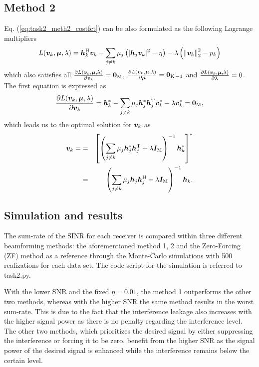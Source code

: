 \documentclass[10pt,a4paper]{article}
\begin{document}
\subsection*{Method 2}
Eq. (\ref{eq:task2_meth2_costfct}) can be also formulated as the following Lagrange multipliers
\begin{equation}
L ( \bm{v}_{k}, \bm{\mu}, \lambda ) =  \bm{h}_{k}^{\operatorname{H}} \bm{v}_k  - \sum_{j \neq k} \mu_{j} \left( \vert \bm{h}_{j} \bm{v}_{k} \vert^{2} - \eta \right) - \lambda \left( \left\lVert\bm{v}_{k}\right\rVert_{2}^{2} - p_{k} \right)
\end{equation} 
which also satisfies all $\frac{ \partial L ( \bm{v}_{k}, \bm{\mu}, \lambda ) }{ \partial \bm{v}_{k}} = \bm{0}_{\operatorname{M}} $, $ \frac{ \partial L ( \bm{v}_{k}, \bm{\mu}, \lambda ) }{ \partial \bm{\mu}} = \bm{0}_{\operatorname{K} -1} $ and $ \frac{ \partial L ( \bm{v}_{k}, \bm{\mu}, \lambda ) }{ \partial \lambda} = 0$. The first equation is expressed as 
\begin{equation}
\frac{ \partial L ( \bm{v}_{k}, \bm{\mu}, \lambda ) }{ \partial \bm{v}_{k}} =  \bm{h}_{k}^{*} - \sum_{j \neq k} \mu_{j} \bm{h}_{j}^{*} \bm{h}_{j}^{\operatorname{T}}  \bm{v}_{k}^{*} - \lambda \bm{v}_{k}^{*} = \bm{0}_{\operatorname{M}},
\end{equation}
which leads us to the optimal solution for $\bm{v}_{k}$ as 
\begin{equation}
\begin{aligned}
\bm{v}_{k} = & = & \left[ \left( \sum_{j \neq k} \mu_{j} \bm{h}_{j}^{*} \bm{h}_{j}^{\operatorname{T}} + \lambda \bm{I}_{ \operatorname{M} } \right)^{-1}  \bm{h}_{k}^{*} \right]^{*} \\
 & = & \left( \sum_{j \neq k} \mu_{j} \bm{h}_{j} \bm{h}_{j}^{\operatorname{H}} + \lambda \bm{I}_{ \operatorname{M} } \right)^{-1} \bm{h}_{k}.
\end{aligned}
\end{equation}

\subsection{Simulation and results}
The sum-rate of the SINR for each receiver is compared within three different  beamforming methods: the aforementioned method 1, 2 and the Zero-Forcing (ZF) method as a reference through the Monte-Carlo simulations with 500 realizations for each data set. The code script for the simulation is referred to task2.py. 

With the lower SNR and the fixed $\eta = 0.01$, the method 1 outperforms the other two methods, whereas with the higher SNR the same method results in the worst sum-rate. This is due to the fact that the interference leakage also increases with the higher signal power as there is no penalty regarding the interference level. The other two methods, which prioritizes the desired signal by either suppressing the interference or forcing it to be zero, benefit from the higher SNR as the signal power of the desired signal is enhanced while the interference remains below the certain level. 
\end{document}
